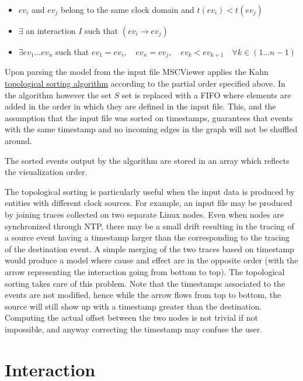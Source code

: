 \documentclass[11pt, twoside, titlepage]{book}
\begin{document}
\begin{itemize}
  \item $ev_i$ and $ev_j$ belong to the same clock domain and $t(ev_i) <
   t(ev_j)$
   \item  $\exists$ an interaction $I$ such that $(ev_i \rightarrow ev_j)$ 
   \item $\exists ev_1\ldots ev_n$ such that $ev_1=ev_i,\quad ev_n=ev_j,\quad
   ev_k<ev_{k+1} \quad \forall k \in (1 \ldots n-1)$
\end{itemize}

Upon parsing the model from the input file MSCViewer applies the Kahn 
\href{http://en.wikipedia.org/wiki/Topological_sorting}{topological sorting
algorithm} according to the partial order specified above. In the algorithm
however the set $S$ set is replaced with a FIFO where elements are added in the
order in which they are defined in the input file. This, and the assumption that
the input file was sorted on timestamps, guarantees that events with the same
timestamp and no incoming edges in the graph will not be shuffled around. 

The sorted events output by the algorithm are stored in an array which reflects
the visualization order.

The topological sorting is particularly useful when the input data is produced
by entities with different clock sources. For example, an input file may be
produced by joining traces collected on two separate Linux nodes. Even when
nodes are synchronized through NTP, there may be a small drift resulting in the
tracing of a source event having a timestamp larger than the corresponding to
the tracing of the destination event. A simple merging of the two traces based
on timestamp would produce a model where cause and effect are in the opposite
order (with the arrow representing the interaction going from bottom to top).
The topological sorting takes care of this problem. Note that the timestamps
associated to the events are not modified, hence while the arrow flows from top
to bottom, the source will still show up with a timestamp greater than the
destination. Computing the actual offset between the two nodes is not trivial
if not impossible, and anyway correcting the timestamp may confuse the user. 

\section {Interaction}
\end{document}

